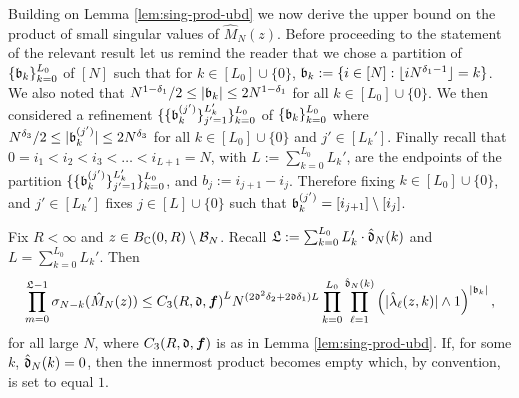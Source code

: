 \documentclass{amsart}
\numberwithin{equation}{section}
\def\corEE{\textcolor{amethyst}}
\def\corEE{}
\def\corAB{}
\def\corOZ{}
\begin{document}
Building on Lemma \ref{lem:sing-prod-ubd} we now derive the upper bound on the product of small singular values of $\hat{M}_N(z)$. Before proceeding to the statement of the relevant result let us remind the reader that we chose a partition of $\{\mathfrak{b}_k\}_{k=0}^{L_0}$ of $[N]$ such that for $k \in [L_0]\cup \{0\}$, $\mathfrak{b}_k:=\{i \in [N]: \lfloor i N^{\delta_1-1}\rfloor=k\}$. We also noted that $N^{1-\delta_1}/2 \le |\mathfrak{b}_k| \le 2 N^{1-\delta_1}$ for all $k \in [L_0] \cup\{0\}$. We then considered a refinement $\{\{\mathfrak{b}_k^{(j')}\}_{j'=1}^{L_k'}\}_{k=0}^{L_0}$ of $\{\mathfrak{b}_k\}_{k=0}^{L_0}$ where $N^{\delta_3}/2 \le |\mathfrak{b}_k^{(j')}| \le 2N^{\delta_3}$ for all $k \in [L_0]\cup \{0\}$ and $j' \in [L_k']$. Finally recall that $0 = i_1 < i_2 < i_3 < \dots  < i_{L+1} = N$, with $L :=\sum_{k=0}^{L_0} L_k'$, are the endpoints of the partition $\{\{\mathfrak{b}_k^{(j')}\}_{j'=1}^{L_k'}\}_{k=0}^{L_0}$, and $b_j:=i_{j+1}-i_j$. Therefore fixing $k \in [L_0] \cup\{0\}$, and $j' \in [L_k']$ fixes $j \in [L]\cup\{0\}$ such that $\mathfrak{b}_{k}^{(j')} = [i_{j+1}]\setminus [i_j]$.






\begin{corollary}\label{cor:sing-prod-ubd}
Fix $R<\infty$ and $z \in B_{\mathbb{C}}(0,R) \setminus \mathcal{B}_N$. Recall $\mathfrak{L}:=\sum_{k=0}^{L_0} L_k' \cdot \hat{\mathfrak{d}}_N(k)$ and $L=\sum_{k=0}^{L_0}L_k'$. Then
\[
  \prod_{m=0}^{\gL-1} \sigma_{N-k}(\hat{M}_N(z)) \leq
  {C_3(R,\gd, {\bm f})}^{L} N^{(\corEE{2\gd^2 \delta_2+2\gd \delta_1})L} \prod_{k=0}^{L_0} \prod_{\ell=1}^{\hat\gd_N(k)} \left(|\hat{\lambda}_\ell(z,k)| \wedge 1\right)^{|\gb_k|},
\]
for all large $N$, where $C_3(R, \mathfrak{d}, {\bm f})$ is as in Lemma \ref{lem:sing-prod-ubd}. If, for some $k$, $\hat{\mathfrak{d}}_N(k)=0$, then the innermost product becomes empty \corAB{which, by convention, is set to} \corOZ{equal $1$.}
\end{corollary}
\end{document}
